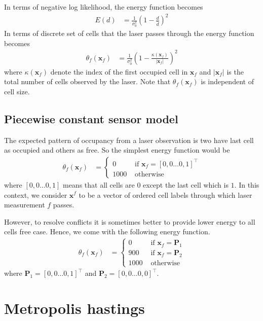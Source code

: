 \documentclass[letterpaper, 10 pt, conference]{ieeeconf} %
\newcommand{\vect}[1]{\mathbf{#1}}
\begin{document}
In terms of negative log likelihood, the energy function becomes
\begin{align}
  E(d) &= \frac{1}{\sigma_0^2}\left(1 - \frac{d}{\bar{d}}\right)^2
\end{align}
In terms of discrete set of cells that the laser passes through the energy function becomes
\begin{align}
  \theta_f(\vect{x}_f) &= \frac{1}{\sigma_0^2}\left(1 - \frac{\kappa(\vect{x}_f)}{|\vect{x}_f|}\right)^2
\end{align}
where $\kappa(\vect{x}_f)$ denote the index of the first occupied cell in $\vect{x}_f$ and $|\vect{x}_f|$ is the total number of cells observed by the laser. Note that $\theta_f(\vect{x}_f)$ is independent of cell size.

\subsection{Piecewise constant sensor model}
The expected pattern of occupancy from a laser observation is two have last cell as occupied and others as free. So the simplest energy function would be 
\begin{align}
  \theta_f(\vect{x}_f) &= \begin{cases}
              0 & \text{ if } \vect{x}_f = [0, 0 \dots 0, 1]^\top\\
           1000 & \text{ otherwise}
  \end{cases}
\end{align}
where $[0, 0 \dots 0, 1]$ means that all cells are $0$ except the last cell which is $1$. In this context, we consider $\vect{x}^f$ to be a vector of ordered cell labels through which laser measurement $f$ passes.

However, to resolve conflicts it is sometimes better to provide lower energy to all cells free case. Hence, we come with the following energy function.
\begin{align}
  \theta_f(\vect{x}_f) &= \begin{cases}
                     0 & \text{ if } \vect{x}_f = \vect{P}_1\\
                   900 & \text{ if } \vect{x}_f = \vect{P}_2\\
                  1000 & \text{ otherwise}
  \end{cases}
\end{align}
where $\vect{P}_1 = [0, 0 \dots 0, 1]^\top$ and $\vect{P}_2 = [0, 0 \dots 0, 0]^\top$.
\section{Metropolis hastings}
\end{document}
